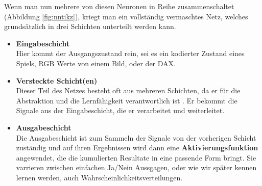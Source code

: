             \noindent
            Wenn man nun mehrere von diesen Neuronen in Reihe zusammenschaltet (Abbildung \ref{fig:nntikz}), kriegt man ein vollständig vermaschtes Netz, welches grundsätzlich in drei Schichten unterteilt werden kann.
            \begin{itemize}
                \setlength{\itemsep}{5pt}
                \item \textbf{Eingabeschicht} \\
                    Hier kommt der Ausgangszustand rein, sei es ein kodierter Zustand eines Spiels, RGB Werte von einem Bild, oder der DAX.
                \item \textbf{Versteckte Schicht(en)} \\
                    Dieser Teil des Netzes besteht oft aus mehreren Schichten, da er für die Abstraktion und die Lernfähigkeit verantwortlich ist \cite{ANNModeling}. Er bekommt die Signale aus der Eingabeschicht, die er verarbeitet und weiterleitet.
                \item \textbf{Ausgabeschicht} \\
                    Die Ausgabeschicht ist zum Sammeln der Signale von der vorherigen Schicht zuständig und auf ihren Ergebnissen wird dann eine \textbf{Aktivierungsfunktion} angewendet, die die kumulierten Resultate in eine passende Form bringt. Sie varrieren zwischen einfachen Ja/Nein Aussgagen, oder wie wir später kennen lernen werden, auch Wahrscheinlichkeitsverteilungen.

            \end{itemize}


